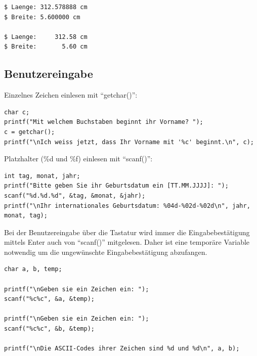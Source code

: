 \documentclass[11pt,a4paper,ngerman, fleqn]{article}
\let\qt\enquote
\let\noi\noindent
\begin{document}
\begin{lstlisting}[language=bash,  backgroundcolor=\color{pureblack}, basicstyle=\ttfamily\footnotesize\color{purewhite}, rulecolor=\color{slightgray}]
$ Laenge: 312.578888 cm
$ Breite: 5.600000 cm

$ Laenge:     312.58 cm
$ Breite:       5.60 cm
\end{lstlisting}


\subsection{Benutzereingabe}
\label{sec:31}


\noi Einzelnes Zeichen einlesen mit \qt{getchar()}:

\begin{lstlisting}
char c;
printf("Mit welchem Buchstaben beginnt ihr Vorname? ");
c = getchar();
printf("\nIch weiss jetzt, dass Ihr Vorname mit '%c' beginnt.\n", c);
\end{lstlisting}

\noi Platzhalter (\%d und \%f) einlesen mit \qt{scanf()}:

\begin{lstlisting}
int tag, monat, jahr;
printf("Bitte geben Sie ihr Geburtsdatum ein [TT.MM.JJJJ]: ");
scanf("%d.%d.%d", &tag, &monat, &jahr);
printf("\nIhr internationales Geburtsdatum: %04d-%02d-%02d\n", jahr, monat, tag);
\end{lstlisting}

\noi Bei der Benutzereingabe über die Tastatur wird immer die Eingabebestätigung mittels Enter auch von \qt{scanf()} mitgelesen. Daher ist eine temporäre Variable notwendig um die ungewünschte Eingabebestätigung abzufangen.

\begin{lstlisting}
char a, b, temp;

printf("\nGeben sie ein Zeichen ein: ");
scanf("%c%c", &a, &temp);

printf("\nGeben sie ein Zeichen ein: ");
scanf("%c%c", &b, &temp);

printf("\nDie ASCII-Codes ihrer Zeichen sind %d und %d\n", a, b);
\end{lstlisting}


\end{document}
